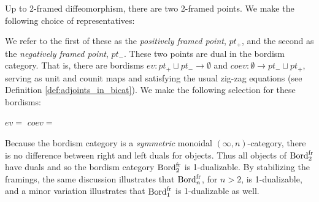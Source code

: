 \documentclass{amsart}
\begin{document}
Up to 2-framed diffeomorphism, there are two 2-framed points. We make the following choice of representatives:
\begin{center}
 \hspace{1.5cm}
\end{center}
We refer to the first of these as the {\em positively framed point}, $pt_+$, and the second as the {\em negatively framed point}, $pt_-$.  These two points are dual in the bordism category.  That is, there are bordisms $ev: pt_+ \sqcup pt_- \to \emptyset$ and $coev: \emptyset \to pt_- \sqcup pt_+$, serving as unit and counit maps and satisfying the usual zig-zag equations (see Definition \ref{def:adjoints_in_bicat}). We make the following selection for these bordisms:
\begin{center}
	$ev =$
	\hspace{1.5cm}
	$coev =$ 
\end{center}
Because the bordism category is a {\em symmetric} monoidal $(\infty,n)$-category, there is no difference between right and left duals for objects.  Thus all objects of $\mathrm{Bord}^\mathrm{fr}_2$ have duals and so the bordism category $\mathrm{Bord}^\mathrm{fr}_2$ is 1-dualizable.  By stabilizing the framings, the same discussion illustrates that $\mathrm{Bord}^\mathrm{fr}_n$, for $n > 2$, is 1-dualizable, and a minor variation illustrates that $\mathrm{Bord}^\mathrm{fr}_1$ is 1-dualizable as well.
\end{document}
